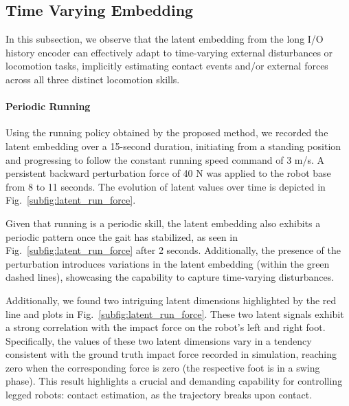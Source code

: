 


\subsection{Time Varying Embedding}
In this subsection, we observe that the latent embedding from the long I/O history encoder can effectively adapt to time-varying external disturbances or locomotion tasks, implicitly estimating contact events and/or external forces across all three distinct locomotion skills.
\paragraph{Periodic Running}
Using the running policy obtained by the proposed method, we recorded the latent embedding over a 15-second duration, initiating from a standing position and progressing to follow the constant running speed command of 3 m/s. 
A persistent backward perturbation force of 40 N was applied to the robot base from 8 to 11 seconds. 
The evolution of latent values over time is depicted in Fig.~\ref{subfig:latent_run_force}.

Given that running is a periodic skill, the latent embedding also exhibits a periodic pattern once the gait has stabilized, as seen in Fig.~\ref{subfig:latent_run_force} after 2 seconds. 
Additionally, the presence of the perturbation introduces variations in the latent embedding (within the green dashed lines), showcasing the capability to capture time-varying disturbances. 

Additionally, we found two intriguing latent dimensions highlighted by the red line and plots in Fig.~\ref{subfig:latent_run_force}. 
These two latent signals exhibit a strong correlation with the impact force on the robot's left and right foot. 
Specifically, the values of these two latent dimensions vary in a tendency consistent with the ground truth impact force recorded in simulation, reaching zero when the corresponding force is zero (the respective foot is in a swing phase).
This result highlights a crucial and demanding capability for controlling legged robots: contact estimation, as the trajectory breaks upon contact. 

